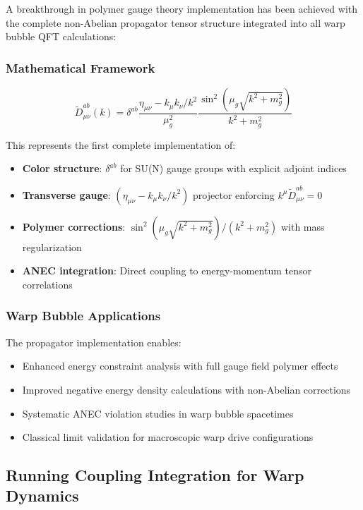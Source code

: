 \documentclass[11pt]{article}
\begin{document}
A breakthrough in polymer gauge theory implementation has been achieved with the complete non-Abelian propagator tensor structure integrated into all warp bubble QFT calculations:

\subsubsection{Mathematical Framework}
\begin{equation}
\tilde{D}^{ab}_{\mu\nu}(k) = \delta^{ab} \frac{\eta_{\mu\nu} - k_\mu k_\nu/k^2}{\mu_g^2} \frac{\sin^2(\mu_g\sqrt{k^2 + m_g^2})}{k^2 + m_g^2}
\end{equation}

This represents the first complete implementation of:
\begin{itemize}
    \item \textbf{Color structure}: $\delta^{ab}$ for SU(N) gauge groups with explicit adjoint indices
    \item \textbf{Transverse gauge}: $(\eta_{\mu\nu} - k_\mu k_\nu/k^2)$ projector enforcing $k^\mu \tilde{D}^{ab}_{\mu\nu} = 0$
    \item \textbf{Polymer corrections}: $\sin^2(\mu_g\sqrt{k^2 + m_g^2})/(k^2 + m_g^2)$ with mass regularization
    \item \textbf{ANEC integration}: Direct coupling to energy-momentum tensor correlations
\end{itemize}

\subsubsection{Warp Bubble Applications}
The propagator implementation enables:
\begin{itemize}
    \item Enhanced energy constraint analysis with full gauge field polymer effects
    \item Improved negative energy density calculations with non-Abelian corrections
    \item Systematic ANEC violation studies in warp bubble spacetimes
    \item Classical limit validation for macroscopic warp drive configurations
\end{itemize}

\subsection{Running Coupling Integration for Warp Dynamics}
\end{document}
